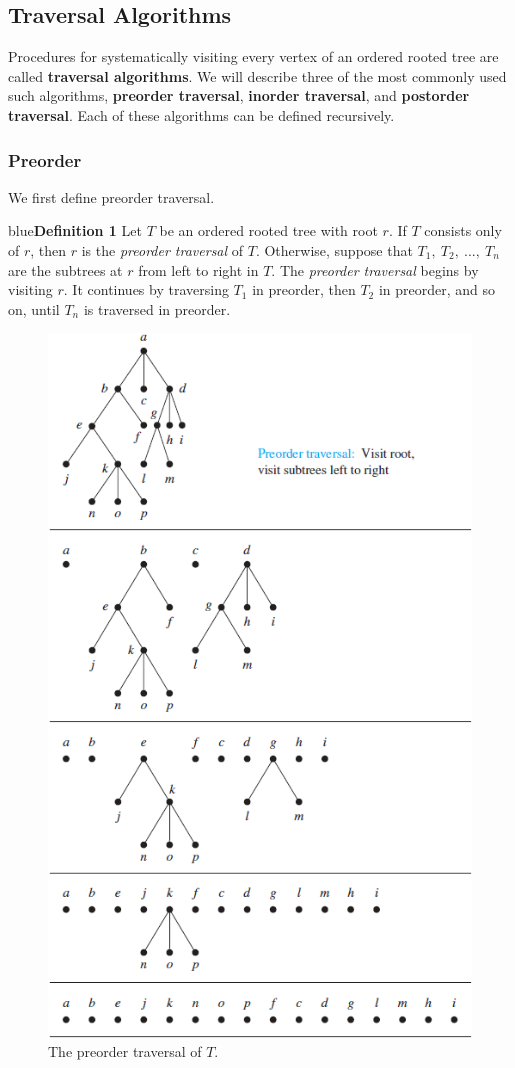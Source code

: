\documentclass{article}
\begin{document}
\subsection{Traversal Algorithms}

Procedures for systematically visiting every vertex of an ordered rooted tree are called \textbf{traversal algorithms}. We will describe three of the most commonly used such algorithms, \textbf{preorder traversal}, \textbf{inorder traversal}, and \textbf{postorder traversal}. Each of these algorithms can be defined recursively.

\newpage
\subsubsection{Preorder}

We first define preorder traversal.

\begin{mybox}{blue}{\textbf{Definition 1}}
Let $T$ be an ordered rooted tree with root $r$. If $T$ consists only of $r$, then $r$ is the \textit{preorder traversal} of $T$. Otherwise, suppose that $T_1,\ T_2,\ ...,\ T_n$ are the subtrees at $r$ from left to right in $T$. The \textit{preorder traversal} begins by visiting $r$. It continues by traversing $T_1$ in preorder, then $T_2$ in preorder, and so on, until $T_n$ is traversed in preorder.
\end{mybox}

\begin{figure}[h!]
    \centering
    \includegraphics[width=.7\textwidth]{img/ch11.3-figure4.png}
    \caption{The preorder traversal of $T$.}
    \label{fig:my_label}
\end{figure}
\end{document}
